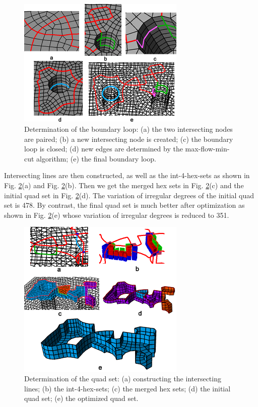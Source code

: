 \documentclass[final,5p,times,twocolumn]{elsarticle}
\begin{document}
\begin{figure}[htbp]
\begin{center}
\includegraphics[width=8cm]{exam1_bound_loop.png}
\caption{Determination of the boundary loop: (a) the two intersecting nodes are paired; (b) a new intersecting node is created; (c) the boundary loop is closed; (d) new edges are determined by the max-flow-min-cut algorithm; (e) the final boundary loop.}
\label{fig:exam1_bound_loop}
\end{center}
\end{figure}

Intersecting lines are then constructed, as well as the int-4-hex-sets as shown in Fig. \ref{fig:exam1_quad_set}(a) and Fig. \ref{fig:exam1_quad_set}(b). Then we get the merged hex sets in Fig. \ref{fig:exam1_quad_set}(c) and the initial quad set in Fig. \ref{fig:exam1_quad_set}(d). The variation of irregular degrees of the initial quad set is 478. By contrast, the final quad set is much better after optimization as shown in Fig. \ref{fig:exam1_quad_set}(e) whose variation of irregular degrees is reduced to 351.

\begin{figure}[htbp]
\begin{center}
\includegraphics[width=8cm]{exam1_quad_set.png}
\caption{Determination of the quad set: (a) constructing the intersecting lines; (b) the int-4-hex-sets; (c) the merged hex sets; (d) the initial quad set; (e) the optimized quad set.}
\label{fig:exam1_quad_set}
\end{center}
\end{figure}
\end{document}
